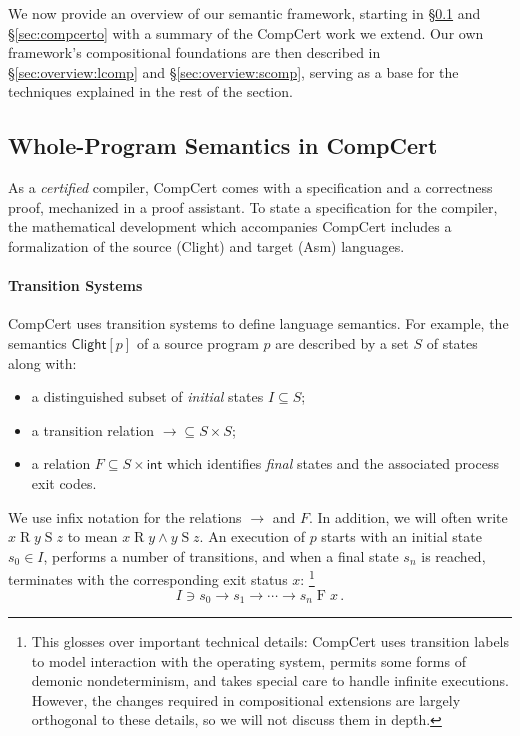 \documentclass[acmsmall,screen,review,anonymous]{acmart}
\newcommand{\kw}[1]{\ensuremath{ \mathsf{#1} }}
\begin{document}
We now provide an overview of our semantic framework,
starting in \S\ref{sec:compcert} and \S\ref{sec:compcerto}
with a summary of the CompCert work we extend.
Our own framework's compositional foundations are then described
in \S\ref{sec:overview:lcomp} and \S\ref{sec:overview:scomp},
serving as a base for the techniques explained in the rest of the section.

\subsection{Whole-Program Semantics in CompCert} \label{sec:compcert} %

As a \emph{certified} compiler,
CompCert comes with a specification
and a correctness proof,
mechanized in a proof assistant.
To state a specification for the compiler,
the mathematical development which accompanies
CompCert
includes a formalization of the source (Clight) and target (Asm) languages.

\paragraph{Transition Systems} %

CompCert uses transition systems
to define language semantics.
For example,
the semantics $\kw{Clight}[p]$
of a source program $p$
are described by a set $S$ of states along with:%
\begin{itemize}
  \item a distinguished subset of \emph{initial} states $I \subseteq S$;
  \item a transition relation ${\rightarrow} \subseteq S \times S$;
  \item a relation $F \subseteq S \times \kw{int}$ which identifies
    \emph{final} states and the associated process exit codes.
\end{itemize}
We use infix notation for the relations $\rightarrow$ and $F$.
In addition, we will often write $x \mathrel{R} y \mathrel{S} z$
to mean $x \mathrel{R} y \mathrel\wedge y \mathrel{S} z$.
An execution of $p$ starts with an initial state $s_0 \in I$,
performs a number of transitions,
and when a final state $s_n$ is reached,
terminates with the corresponding exit status $x$:%
\footnote{%
  This glosses over important technical details:
  CompCert uses transition labels to model interaction with the operating system,
  permits some forms of demonic nondeterminism,
  and takes special care to handle infinite executions.
  However, the changes required in compositional extensions
  are largely orthogonal to these details,
  so we will not discuss them in depth.}
\begin{equation}
  I \ni s_0 \rightarrow s_1 \rightarrow \cdots \rightarrow s_n \mathrel{F} x
  \,.
  \label{eqn:clightexec}
\end{equation}
\end{document}

